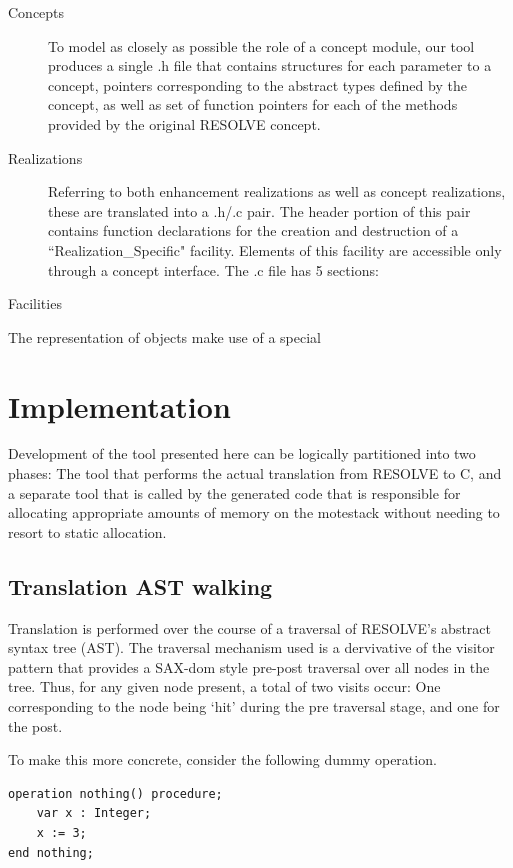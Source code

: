 \documentclass{sig-alternate}
\begin{document}
\begin{description}
\item [Concepts]
To model as closely as possible the role of a concept module, our tool produces a single .h file that contains structures for each parameter to a concept, pointers corresponding to the abstract types defined by the concept, as well as set of function pointers for each of the methods provided by the original RESOLVE concept.

\item [Realizations] 
Referring to both enhancement realizations as well as concept realizations, these are translated into a .h/.c pair. The header portion of this pair contains function declarations for the creation and destruction of a ``Realization\_Specific" facility. Elements of this facility are accessible only through a concept interface. The .c file has 5 sections:

\item [Facilities]


\end{description}




The representation of objects make use of a special 

\section{Implementation}
Development of the tool presented here can be logically partitioned into two phases: The tool that performs the actual translation from RESOLVE to C, and a separate tool that is called by the generated code that is responsible for allocating appropriate amounts of memory on the motestack without needing to resort to static allocation. 

\subsection{Translation AST walking}
Translation is performed over the course of a traversal of RESOLVE's abstract syntax tree (AST). The traversal mechanism used is a dervivative of the visitor pattern that provides a SAX-dom style pre-post traversal over all nodes in the tree. Thus, for any given node present, a total of two visits occur: One corresponding to the node being `hit' during the pre traversal stage, and one for the post. 

To make this more concrete, consider the following dummy operation.

\begin{verbatim}
operation nothing() procedure;
    var x : Integer;
    x := 3;
end nothing;
\end{verbatim}
\end{document}
